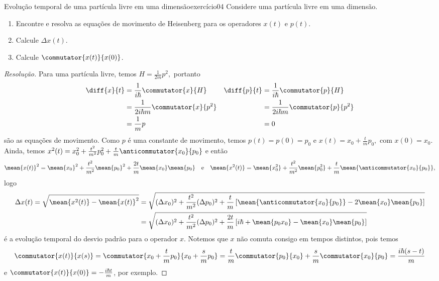 \begin{exercício}{Evolução temporal de uma partícula livre em uma dimensão}{exercício04}
    Considere uma partícula livre em uma dimensão.
    \begin{enumerate}[label=(\alph*)]
        \item Encontre e resolva as equações de movimento de Heisenberg para os operadores \(x(t)\) e \(p(t)\).
        \item Calcule \(\Delta x(t)\).
        \item Calcule \(\commutator{x(t)}{x(0)}\).
    \end{enumerate}
\end{exercício}
\begin{proof}[Resolução]
    Para uma partícula livre, temos \(H = \frac{1}{2m}p^2,\) portanto
    \begin{align*}
        \diff{x}{t} &= \frac{1}{i \hbar}\commutator{x}{H}&
        \diff{p}{t} &= \frac{1}{i \hbar}\commutator{p}{H}\\
                    &= \frac{1}{2i \hbar m}\commutator{x}{p^2}&
                    &= \frac{1}{2i \hbar m} \commutator{p}{p^2}\\
                    &= \frac{1}{m}p&
                    &= 0
    \end{align*}
    são as equações de movimento. Como \(p\) é uma constante de movimento, temos \(p(t) = p(0) = p_0\) e \(x(t) = x_0 + \frac{t}{m}p_0,\) com \(x(0) = x_0\). Ainda, temos \(x^2(t) = x_0^2 + \frac{t^2}{m^2} p_0^2 + \frac{t}{m}\anticommutator{x_0}{p_0}\) e então
    \begin{equation*}
        \mean{x(t)}^2 = \mean{x_0}^2 + \frac{t^2}{m^2} \mean{p_0}^2 + \frac{2 t}{m} \mean{x_0} \mean{p_0}
        \quad\text{e}\quad
        \mean{x^2(t)} = \mean{x_0^2} + \frac{t^2}{m^2} \mean{p_0^2} + \frac{t}{m} \mean{\anticommutator{x_0}{p_0}},
    \end{equation*}
    logo
    \begin{align*}
        \Delta x(t) = \sqrt{\mean{x^2(t)} - \mean{x(t)}^2} &= \sqrt{(\Delta x_0)^2 + \frac{t^2}{m^2} (\Delta p_0)^2 + \frac{t}{m} \left[\mean{\anticommutator{x_0}{p_0}} - 2\mean{x_0}\mean{p_0}\right]}\\
                                                           &=\sqrt{(\Delta x_0)^2 + \frac{t^2}{m^2} (\Delta p_0)^2 + \frac{2t}{m} \left[i \hbar + \mean{p_0 x_0} - \mean{x_0}\mean{p_0}\right]}
    \end{align*}
    é a evolução temporal do desvio padrão para o operador \(x\). Notemos que \(x\) não comuta consigo em tempos distintos, pois temos
    \begin{equation*}
        \commutator{x(t)}{x(s)} = \commutator{x_0 + \frac{t}{m} p_0}{x_0 + \frac{s}{m} p_0} = \frac{t}{m}\commutator{p_0}{x_0}  +\frac{s}{m} \commutator{x_0}{p_0}= \frac{i\hbar (s - t)}{m}
    \end{equation*}
    e \(\commutator{x(t)}{x(0)} = -\frac{i \hbar t}{m}\), por exemplo.
\end{proof}
